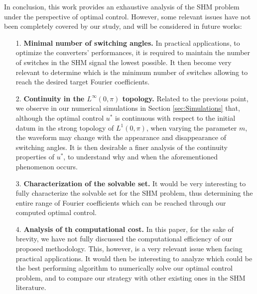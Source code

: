 \documentclass[9pt,shortpaper,twoside,web]{ieeecolor}
\begin{document}
In conclusion, this work provides an exhaustive analysis of the SHM problem under the perspective of optimal control. However, some relevant issues have not been completely covered by our study, and will be considered in future works:
\begin{itemize}
	\item[1.] \textbf{Minimal number of switching angles.} In practical applications, to optimize the converters' performances, it is required to maintain the number of switches in the SHM signal the lowest possible. It then become very relevant to determine which is the minimum number of switches allowing to reach the desired target Fourier coefficients.
	\item[2.] \textbf{Continuity in the $L^\infty(0,\pi)$ topology.} Related to the previous point, we observe in our numerical simulations in Section \ref{sec:Simulations} that, although the optimal control $u^\ast$ is continuous with respect to the initial datum in the strong topology of $L^1(0,\pi)$, when varying the parameter $m$, the waveform may change with the appearance and disappearance of switching angles. It is then desirable a finer analysis of the continuity properties of $u^\ast$, to understand why and when the aforementioned phenomenon occurs.
	\item[3.] \textbf{Characterization of the solvable set.} It would be very interesting to fully characterize the solvable set for the SHM problem, thus determining the entire range of Fourier coefficients which can be reached through our computed optimal control.
	\item[4.] \textbf{Analysis of th computational cost.} In this paper, for the sake of brevity, we have not fully discussed the computational efficiency of our proposed methodology. This, however, is a very relevant issue when facing practical applications. It would then be interesting to analyze which could be the best performing algorithm to numerically solve our optimal control problem, and to compare our strategy with other existing ones in the SHM literature.
\end{itemize}

\end{document}
